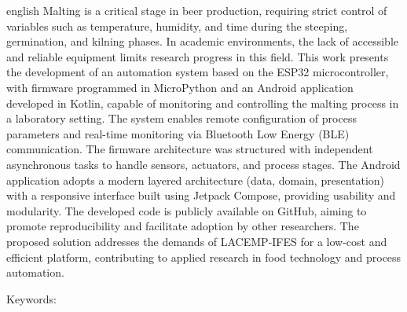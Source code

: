 \begin{resumo}[Abstract]
  \vspace{-15pt}
  
  \begin{otherlanguage*}{english}
    Malting is a critical stage in beer production, requiring strict control of variables such as temperature, humidity, and time during the steeping, germination, and kilning phases. In academic environments, the lack of accessible and reliable equipment limits research progress in this field. This work presents the development of an automation system based on the ESP32 microcontroller, with firmware programmed in MicroPython and an Android application developed in Kotlin, capable of monitoring and controlling the malting process in a laboratory setting. The system enables remote configuration of process parameters and real-time monitoring via Bluetooth Low Energy (BLE) communication. The firmware architecture was structured with independent asynchronous tasks to handle sensors, actuators, and process stages. The Android application adopts a modern layered architecture (data, domain, presentation) with a responsive interface built using Jetpack Compose, providing usability and modularity. The developed code is publicly available on GitHub, aiming to promote reproducibility and facilitate adoption by other researchers. The proposed solution addresses the demands of LACEMP-IFES for a low-cost and efficient platform, contributing to applied research in food technology and process automation.
  
  Keywords: \inlinekeywords
\end{otherlanguage*}
\end{resumo}